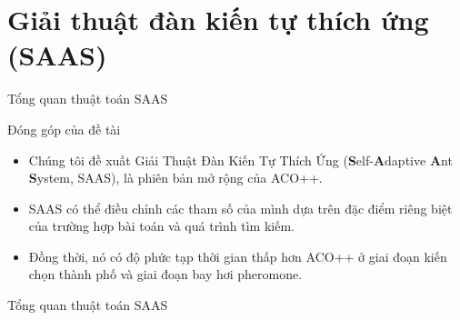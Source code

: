 \documentclass[aspectratio=169]{beamer}
\begin{document}


\section{Giải thuật đàn kiến tự thích ứng (SAAS)}
\begin{frame}{Tổng quan thuật toán SAAS}
    \begin{block}{Đóng góp của đề tài}
        \begin{itemize}
            \justifying
            \vspace{0.1cm}
            \item Chúng tôi đề xuất Giải Thuật Đàn Kiến Tự Thích Ứng (\textbf{S}elf-\textbf{A}daptive \textbf{A}nt \textbf{S}ystem, SAAS), là phiên bản mở rộng của ACO++.
            \vspace{0.1cm}
            \item SAAS có thể điều chỉnh các tham số của mình dựa trên đặc điểm riêng biệt của trường hợp bài toán và quá trình tìm kiếm.
            \vspace{0.1cm}
            \item Đồng thời, nó có độ phức tạp thời gian thấp hơn ACO++ ở giai đoạn kiến chọn thành phố và giai đoạn bay hơi pheromone.
            \vspace{0.1cm}
        \end{itemize}
    \end{block}
\end{frame}

\begin{frame}{Tổng quan thuật toán SAAS}
    \vspace{0.1cm}
    \centering
    
\end{frame}
\end{document}
